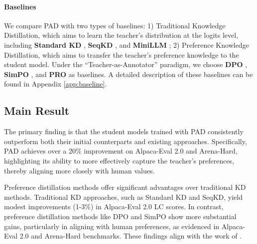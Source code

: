 \paragraph{Baselines}
We compare PAD with two types of baselines: 
1) Traditional Knowledge Distillation, which aims to learn the teacher's distribution at the logits level, including \textbf{Standard KD} \citep{hinton2015distill}, \textbf{SeqKD}
 \citep{kim-rush-2016-sequence}, and \textbf{MiniLLM} \citep{gu-2024-minillm}; 
2) Preference Knowledge Distillation, which aims to transfer the teacher's preference knowledge to the student model. Under the ``Teacher-as-Annotator'' paradigm, we choose \textbf{DPO} \citep{tunstall-2024-zephyr}, \textbf{SimPO} \citep{meng-2024-simpo}, and \textbf{PRO} \citep{song-2024-pro} as baselines. A detailed description of these baselines can be found in Appendix \ref{app:baseline}.

\subsection{Main Result}
\label{sec:main_result}
The primary finding is that the student models trained with PAD consistently outperform both their initial counterparts and existing approaches. Specifically, PAD achieves over a 20\% improvement on Alpaca-Eval 2.0 and Arena-Hard, highlighting its ability to more effectively capture the teacher's preferences, thereby aligning more closely with human values.

Preference distillation methods offer significant advantages over traditional KD methods. Traditional KD approaches, such as Standard KD and SeqKD, yield modest improvements (1-3\%) in Alpaca-Eval 2.0 LC scores. In contrast, preference distillation methods like DPO and SimPO show more substantial gains, particularly in aligning with human preferences, as evidenced in Alpaca-Eval 2.0 and Arena-Hard benchmarks. These findings align with the work of \citet{tunstall-2024-zephyr}.





